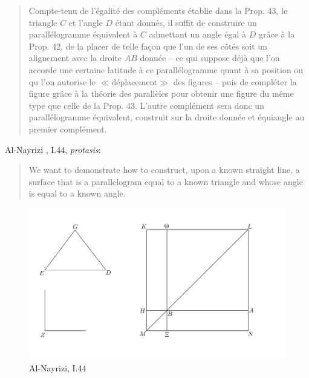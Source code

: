 \documentclass{article}
\begin{document}
\begin{quote}
Compte-tenu de l'\'egalit\'e des compl\'ements \'etablie dans la Prop. 43, le
triangle $C$ et l'angle $D$ \'etant donn\'es, il suffit de construire un parall\'elogramme
\'equivalent \`a $C$ admettant un angle \'egal \`a $D$ gr{\^a}ce \`a la Prop. 42,
de la placer de telle fa{\c c}on que l'un de ses c{\^o}t\'es soit un alignement avec la
droite $AB$ donn\'ee -- ce qui suppose d\'ej\`a que l'on accorde une certaine
latitude \`a ce parall\'elogramme quant \`a sa position ou qu l'on autorise le
{$\ll$}d\'eplacement{$\gg$} des figures -- puis de compl\'eter la figure gr{\^a}ce \`a la
th\'eorie des parall\`eles pour obtenir une figure du m{\^e}me type que celle de
la Prop. 43. L'autre compl\'ement sera donc un parall\'elogramme \'equivalent,
construit sur la droite donn\'ee et \'equiangle au premier compl\'ement.
\end{quote}

Al-Nayrizi \cite[p.~188]{alnayriziI}, I.44, {\em protasis}:

\begin{quote}
We want to demonstrate how to construct, upon a known
straight line, a surface that is a parallelogram equal to a known triangle
and whose angle is equal to a known angle.
\end{quote}

\begin{figure}
\begin{center}
\includegraphics{nayriziI44.png}
\end{center}
\caption{Al-Nayrizi, I.44}
\label{nayriziI44}
\end{figure}
\end{document}
